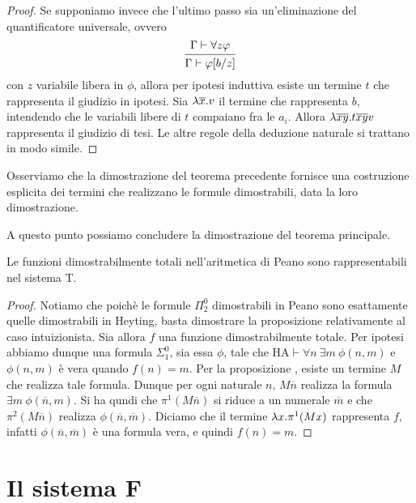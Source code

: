 \documentclass[]{marticle}
\begin{document}
\begin{proof}
    Se supponiamo invece che l'ultimo passo sia un'eliminazione del
    quantificatore universale, ovvero
    \[
        \begin{prooftree}
            \hypo{\Gamma\vdash \forall z \phi}
            \infer1{\Gamma\vdash \phi\sub{b}{z}}
        \end{prooftree}
    \]
    con $z$ variabile libera in $\phi$, allora per ipotesi induttiva esiste un
    termine $t$ che rappresenta il giudizio in ipotesi. Sia $\lambda \overline{x}. v$
    il termine che rappresenta $b$, intendendo che le variabili libere di $t$
    compaiano fra le $a_i$. Allora $\lambda \overline{x}\overline{y}. t\overline{x}
    \overline{y}v$ rappresenta il giudizio di tesi.
    Le altre regole della deduzione naturale si trattano in modo simile.
\end{proof}

Osserviamo che la dimostrazione del teorema precedente fornisce una costruzione
esplicita dei termini che realizzano le formule dimostrabili, data la loro
dimostrazione.

A questo punto possiamo concludere la dimostrazione del teorema principale.
\begin{block}[Proposizione]
    Le funzioni dimostrabilmente totali nell'aritmetica di Peano sono
    rappresentabili nel sistema T.
\end{block}
\begin{proof}
    Notiamo che poich\`e le formule $\Pi^0_2$ dimostrabili in Peano sono
    esattamente quelle dimostrabili in Heyting, basta dimostrare la
    proposizione relativamente al caso intuizionista. Sia allora $f$ una
    funzione dimostrabilmente totale.
    Per ipotesi abbiamo dunque una formula $\Sigma^0_1$, sia essa $\phi$, tale
    che $\text{HA} \vdash \forall n\ \exists m\ \phi(n,m)$ e $\phi(n,m)$ \`e
    vera quando $f(n)=m$. Per la proposizione , esiste un termine $M$
    che realizza tale formula. Dunque per ogni naturale $n$, $M\overline{n}$
    realizza la formula $\exists m\ \phi(\overline{n}, m)$. Si ha qundi che
    $\pi^1(M\overline{n})$ si riduce a un numerale $\overline{m}$ e che
    $\pi^2(M\overline{n})$ realizza $\phi(\overline{n}, \overline{m})$. Diciamo
    che il termine $\lambda x. \pi^1 (Mx)$ rappresenta $f$, infatti $\phi(
    \overline{n}, \overline{m})$ \`e una formula vera, e quindi $f(n)=m$.
\end{proof}

\section{Il sistema F}
\end{document}
